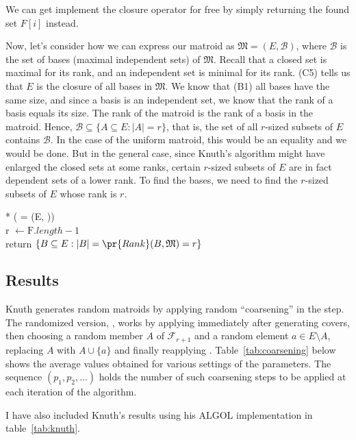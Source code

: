 We can get implement the closure operator for free by simply returning the found set $F[i]$ instead.

Now, let's consider how we can express our matroid as $\mathfrak{M} = (E, \mathcal{B})$, where $\mathcal{B}$ is the set of bases (maximal independent sets) of $\mathfrak{M}$. Recall that a closed set is maximal for its rank, and an independent set is minimal for its rank. (C5) tells us that $E$ is the closure of all bases in $\mathfrak{M}$. We know that (B1) all bases have the same size, and since a basis is an independent set, we know that the rank of a basis equals its size. The rank of the matroid is the rank of a basis in the matroid. Hence, $\mathcal{B} \subseteq \{ A\subseteq E: |A| = r\}$, that is, the set of all $r$-sized subsets of $E$ contains $\mathcal{B}$. In the case of the uniform matroid, this would be an equality and we would be done. But in the general case, since Knuth's algorithm might have enlarged the closed sets at some ranks, certain $r$-sized subsets of $E$ are in fact dependent sets of a lower rank. To find the bases, we need to find the $r$-sized subsets of $E$ whose rank is $r$.

\begin{pseudo}*
  ({ = (E, )}) \\
  r $\leftarrow \mathrm{F}.length - 1$ \\
  return $\{ B \subseteq E : |B| = \pr{Rank}(B, \mathfrak{M}) = r \}$
\end{pseudo}

\subsection*{Results}
Knuth generates random matroids by applying random ``coarsening'' in the  step. The randomized version, , works by applying  immediately after generating covers, then choosing a random member $A$ of $\mathcal{F}_{r+1}$ and a random element $a \in E \setminus A$, replacing $A$ with $A \cup \{a\}$ and finally reapplying . Table \ref{tab:coarsening} below shows the average values obtained for various settings of the parameters. The sequence $(p_1, p_2, \ldots)$ holds the number of such coarsening steps to be applied at each iteration of the algorithm.

I have also included Knuth's results using his ALGOL implementation in table \ref{tab:knuth}.

